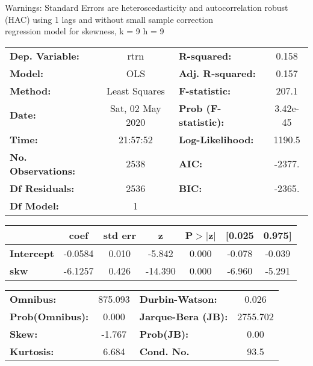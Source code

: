 Warnings: \newline
 [1] Standard Errors are heteroscedasticity and autocorrelation robust (HAC) using 1 lags and without small sample correction\\ 

regression model for skewness, k = 9 h = 9\begin{center}
\begin{tabular}{lclc}
\toprule
\textbf{Dep. Variable:}    &       rtrn       & \textbf{  R-squared:         } &     0.158   \\
\textbf{Model:}            &       OLS        & \textbf{  Adj. R-squared:    } &     0.157   \\
\textbf{Method:}           &  Least Squares   & \textbf{  F-statistic:       } &     207.1   \\
\textbf{Date:}             & Sat, 02 May 2020 & \textbf{  Prob (F-statistic):} &  3.42e-45   \\
\textbf{Time:}             &     21:57:52     & \textbf{  Log-Likelihood:    } &    1190.5   \\
\textbf{No. Observations:} &        2538      & \textbf{  AIC:               } &    -2377.   \\
\textbf{Df Residuals:}     &        2536      & \textbf{  BIC:               } &    -2365.   \\
\textbf{Df Model:}         &           1      & \textbf{                     } &             \\
\bottomrule
\end{tabular}
\begin{tabular}{lcccccc}
                   & \textbf{coef} & \textbf{std err} & \textbf{z} & \textbf{P$> |$z$|$} & \textbf{[0.025} & \textbf{0.975]}  \\
\midrule
\textbf{Intercept} &      -0.0584  &        0.010     &    -5.842  &         0.000        &       -0.078    &       -0.039     \\
\textbf{skw}       &      -6.1257  &        0.426     &   -14.390  &         0.000        &       -6.960    &       -5.291     \\
\bottomrule
\end{tabular}
\begin{tabular}{lclc}
\textbf{Omnibus:}       & 875.093 & \textbf{  Durbin-Watson:     } &    0.026  \\
\textbf{Prob(Omnibus):} &   0.000 & \textbf{  Jarque-Bera (JB):  } & 2755.702  \\
\textbf{Skew:}          &  -1.767 & \textbf{  Prob(JB):          } &     0.00  \\
\textbf{Kurtosis:}      &   6.684 & \textbf{  Cond. No.          } &     93.5  \\
\bottomrule
\end{tabular}
\end{center}

